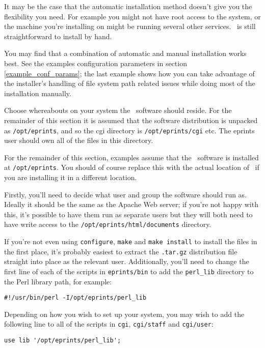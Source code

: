 It may be the case that the automatic installation method doesn't give you the flexibility you need. For example you might not have root access to the system, or the machine you're installing on might be running several other services. \eprints\ is still straightforward to install by hand.

You may find that a combination of automatic and manual installation works best. See the examples configuration parameters in section \ref{example_conf_params}; the last example shows how you can take advantage of the installer's handling of file system path related issues while doing most of the installation manually.

Choose whereabouts on your system the \eprints\ software should reside. For the remainder of this section it is assumed that the software distribution is unpacked as {\tt /opt/eprints}, and so the cgi directory is {\tt /opt/eprints/cgi} etc. The eprints user should own all of the files in this directory.

For the remainder of this section, examples assume that the \eprints\ software is installed at {\tt /opt/eprints}. You should of course replace this with the actual location of \eprints\ if you are installing it in a different location.

Firstly, you'll need to decide what user and group the software should run as. Ideally it should be the same as the Apache Web server; if you're not happy with this, it's possible to have them run as separate users but they will both need to have write access to the {\tt /opt/eprints/html/documents} directory.

If you're not even using {\tt configure}, {\tt make} and {\tt make install} to install the files in the first place, it's probably easiest to extract the {\tt .tar.gz} distribution file straight into place as the relevant user. Additionally, you'll need to change the first line of each of the scripts in {\tt eprints/bin} to add the {\tt perl\_lib} directory to the Perl library path, for example:

\begin{verbatim}
#!/usr/bin/perl -I/opt/eprints/perl_lib
\end{verbatim}

Depending on how you wish to set up your system, you may wish to add the following line to all of the scripts in {\tt cgi}, {\tt cgi/staff} and {\tt cgi/user}:

\begin{verbatim}
use lib '/opt/eprints/perl_lib';
\end{verbatim}

